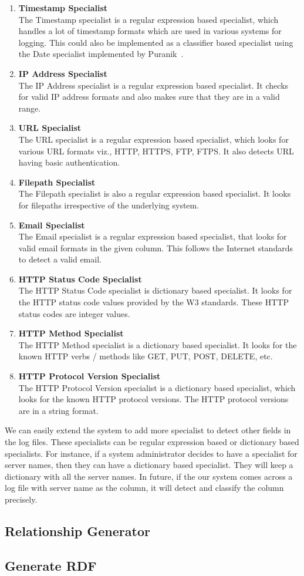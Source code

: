 \begin{enumerate}
\item \textbf{Timestamp Specialist}\\
The Timestamp specialist is a regular expression based specialist, which handles a lot of timestamp formats which are used in various systems for logging. This could also be implemented as a classifier based specialist using the Date specialist implemented by Puranik~\cite{puranik2012specialist}.
\item \textbf{IP Address Specialist}\\
The IP Address specialist is a regular expression based specialist. It checks for valid IP address formats and also makes sure that they are in a valid range.
\item \textbf{URL Specialist}\\
The URL specialist is a regular expression based specialist, which looks for various URL formats viz., HTTP, HTTPS, FTP, FTPS. It also detects URL having basic authentication.
\item \textbf{Filepath Specialist}\\
The Filepath specialist is also a regular expression based specialist. It looks for filepaths irrespective of the underlying system.
\item \textbf{Email Specialist}\\
The Email specialist is a regular expression based specialist, that looks for valid email formats in the given column. This follows the Internet standards to detect a valid email.
\item \textbf{HTTP Status Code Specialist}\\
The HTTP Status Code specialist is dictionary based specialist. It looks for the HTTP status code values provided by the W3 standards. These HTTP status codes are integer values.
\item \textbf{HTTP Method Specialist}\\
The HTTP Method specialist is a dictionary based specialist. It looks for the known HTTP verbs / methods like GET, PUT, POST, DELETE, etc.
\item \textbf{HTTP Protocol Version Specialist}\\
The HTTP Protocol Version specialist is a dictionary based specialist, which looks for the known HTTP protocol versions. The HTTP protocol versions are in a string format.
\end{enumerate}

We can easily extend the system to add more specialist to detect other fields in the log files. These specialists can be regular expression based or dictionary based specialists. For instance, if a system administrator decides to have a specialist for server names, then they can have a dictionary based specialist. They will keep a dictionary with all the server names. In future, if the our system comes across a log file with server name as the column, it will detect and classify the column precisely.
 

\subsection{Relationship Generator}
\label{Relationship Generator}

\subsection{Generate RDF}
\label{Generate RDF}
